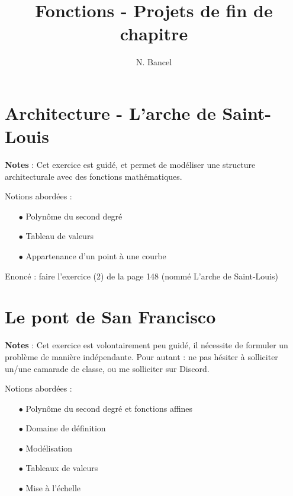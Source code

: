 \documentclass[a4paper,12pt]{article}
\begin{document}
\title{Fonctions - Projets de fin de chapitre}
\author{N. Bancel}

\sloppy  %
\maketitle

\section{Architecture - L'arche de Saint-Louis}

\begin{tcolorbox}
  \textbf{Notes} : Cet exercice est guidé, et permet de modéliser une structure architecturale avec des fonctions mathématiques. \par
  \vspace{1em}
  Notions abordées :
  \begin{itemize}[noitemsep]
    \item[$\bullet$] Polynôme du second degré
    \item[$\bullet$] Tableau de valeurs
    \item[$\bullet$] Appartenance d'un point à une courbe
  \end{itemize}
  \end{tcolorbox}

Enoncé : faire l'exercice (2) de la page 148 (nommé L'arche de Saint-Louis)


\section{Le pont de San Francisco}

\begin{tcolorbox}
  \textbf{Notes} : Cet exercice est volontairement peu guidé, il nécessite de formuler un problème de manière indépendante. Pour autant : ne pas hésiter à solliciter un/une camarade de classe, ou me solliciter sur Discord. \par
  \vspace{1em}
  Notions abordées :
  \begin{itemize}[noitemsep]
    \item[$\bullet$] Polynôme du second degré et fonctions affines
    \item[$\bullet$] Domaine de définition
    \item[$\bullet$] Modélisation
    \item[$\bullet$] Tableaux de valeurs
    \item[$\bullet$] Mise à l'échelle
  \end{itemize}
  \end{tcolorbox}
\end{document}
